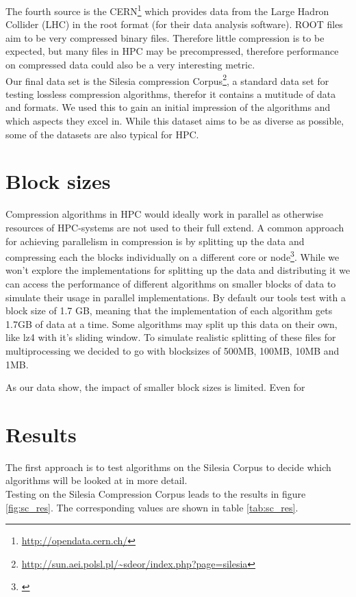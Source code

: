 \documentclass[
	12pt,
	a4paper,
	BCOR10mm,
	DIV14,
	listof=totoc,
	bibliography=totoc,
	headsepline
]{scrreprt}
\newcommand*{\mcite}[1]{\footnote{\cite{#1}}}
\begin{document}
The fourth source is the CERN\footnote{\url{http://opendata.cern.ch/}} which provides data from the Large Hadron Collider (LHC) in the root format (for their data analysis software).
ROOT files aim to be very compressed binary files. Therefore little compression is to be expected, but many files in HPC may be precompressed, therefore performance on compressed data could also be a very interesting metric.
\\

Our final data set is the Silesia compression Corpus\footnote{\url{http://sun.aei.polsl.pl/~sdeor/index.php?page=silesia}}, a standard data set for testing lossless compression algorithms, therefor it contains a mutitude of data and formats. We used this to gain an initial impression of the algorithms and which aspects they excel in. While this dataset aims to be as diverse as possible, some of the datasets are also typical for HPC.
\\

\newpage
\section*{Block sizes}
Compression algorithms in HPC would ideally work in parallel as otherwise resources of HPC-systems are not used to their full extend.
A common approach for achieving parallelism in compression is by splitting up the data and compressing each the blocks individually on a different core or node\mcite{BenComp}.
While we won't explore the implementations for splitting up the data and distributing it we can access the performance of different algorithms on smaller blocks of data to simulate their usage in parallel implementations.
By default our tools test with a block size of 1.7 GB, meaning that the implementation of each algorithm gets 1.7GB of data at a time. 
Some algorithms may split up this data on their own, like lz4 with it's sliding window. %
To simulate realistic splitting of these files for multiprocessing we decided to go with blocksizes of 500MB, 100MB, 10MB and 1MB.


As our data show, the impact of smaller block sizes is limited. Even for %


\section{Results}
The first approach is to test algorithms on the Silesia Corpus to decide which algorithms will be looked at in more detail.
\\
Testing on the Silesia Compression Corpus leads to the results in figure \ref{fig:sc_res}. 
The corresponding values are shown in table \ref{tab:sc_res}. \\
\end{document}
